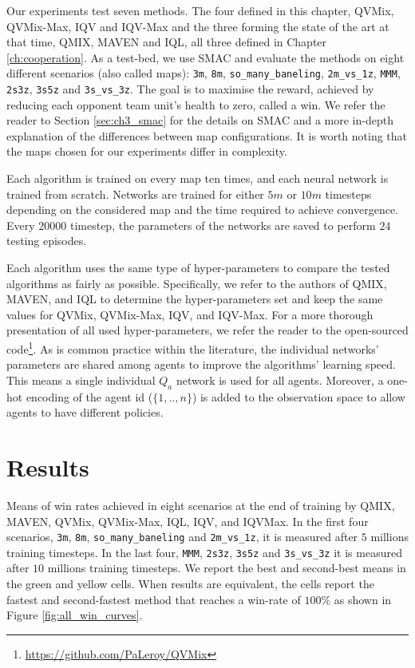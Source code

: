 Our experiments test seven methods.
The four defined in this chapter, QVMix, QVMix-Max, IQV and IQV-Max and the three forming the state of the art at that time, QMIX, MAVEN and IQL, all three defined in Chapter \ref{ch:cooperation}.
As a test-bed, we use SMAC and evaluate the methods on eight different scenarios (also called maps): \texttt{3m}, \texttt{8m}, \texttt{so\_many\_baneling}, \texttt{2m\_vs\_1z}, \texttt{MMM}, \texttt{2s3z}, \texttt{3s5z} and \texttt{3s\_vs\_3z}. 
The goal is to maximise the reward, achieved by reducing each opponent team unit's health to zero, called a win.
We refer the reader to Section \ref{sec:ch3_smac} for the details on SMAC and a more in-depth explanation of the differences between map configurations.
It is worth noting that the maps chosen for our experiments differ in complexity. 

Each algorithm is trained on every map ten times, and each neural network is trained from scratch.
Networks are trained for either $5m$ or $10m$ timesteps depending on the considered map and the time required to achieve convergence.
Every $20000$ timestep, the parameters of the networks are saved to perform $24$ testing episodes.

Each algorithm uses the same type of hyper-parameters to compare the tested algorithms as fairly as possible.
Specifically, we refer to the authors of QMIX, MAVEN, and IQL to determine the hyper-parameters set and keep the same values for QVMix, QVMix-Max, IQV, and IQV-Max. 
For a more thorough presentation of all used hyper-parameters, we refer the reader to the open-sourced code\footnote{\url{https://github.com/PaLeroy/QVMix}}.
As is common practice within the literature, the individual networks' parameters are shared among agents to improve the algorithms' learning speed.
This means a single individual $Q_a$ network is used for all agents.
Moreover, a one-hot encoding of the agent id ($\{1,..,n\}$) is added to the observation space to allow agents to have different policies.

\section{Results} \label{sec:ch4_results}

\begin{table}
    \centering
    
    \caption{
    Means of win rates achieved in eight scenarios at the end of training by QMIX, MAVEN, QVMix, QVMix-Max, IQL, IQV, and IQVMax. 
    In the first four scenarios, \texttt{3m}, \texttt{8m}, \texttt{so\_many\_baneling} and \texttt{2m\_vs\_1z}, it is measured after $5$ millions training timesteps.
    In the last four, \texttt{MMM}, \texttt{2s3z}, \texttt{3s5z} and \texttt{3s\_vs\_3z} it is measured after $10$ millions training timesteps.
    We report the best and second-best means in the green and yellow cells. When results are equivalent, the cells report the fastest and second-fastest method that reaches a win-rate of $100\%$ as shown in Figure \ref{fig:all_win_curves}.}
    \label{tab:main_results}
\end{table}

